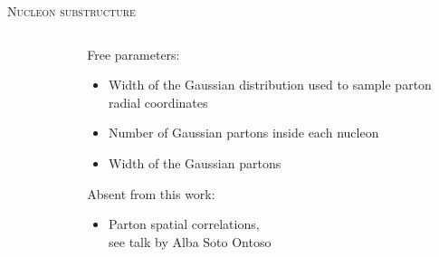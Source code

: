 \documentclass[aspectratio=169]{beamer}
\begin{document}
\begin{frame}[t, plain]{\scshape Nucleon substructure}
\begin{columns}[t]
\begin{column}{.2\textwidth}
\begin{figure}
      \end{figure}
    \end{column}
    \begin{column}{.4\textwidth}
      \centering
      \textcolor{theme}{Free parameters:}\\[1ex]
      \begin{itemize}
        \small
        \item Width of the Gaussian distribution used to sample
          parton radial coordinates
        \item Number of Gaussian partons inside each nucleon
        \item Width of the Gaussian partons
      \end{itemize}
      \bigskip
      \textcolor{theme}{Absent from this work:}\\[1ex]
      \begin{itemize}
        \small
        \item Parton spatial correlations,\\
          see talk by Alba Soto Ontoso 
      \end{itemize}
    \end{column}
  \end{columns}
\end{frame}
\end{document}
